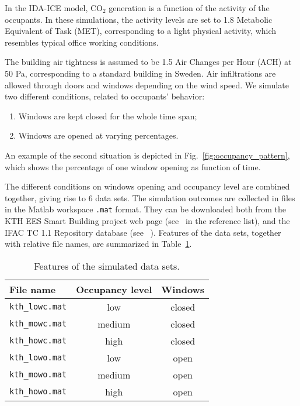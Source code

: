 \documentclass{article}
\begin{document}
In the IDA-ICE model, CO$_2$ generation is a function of the activity of the
occupants. In these simulations, the activity levels are set to 1.8 Metabolic
Equivalent of Task (MET), corresponding to a light physical activity, which
resembles typical office working conditions.

The building air tightness is assumed to be 1.5 Air Changes per Hour (ACH) at
50 Pa, corresponding to a standard building in Sweden. Air infiltrations
are allowed through doors and windows depending on the wind speed.
We simulate two different conditions, related to occupants' behavior:
\begin{enumerate}
\item Windows are kept closed for the whole time span;
\item Windows are opened at varying percentages.
\end{enumerate}
An example of the second situation is depicted in
Fig.~\ref{fig:occupancy_pattern}, which shows the percentage of one window
opening as function of time.

The different conditions on windows opening and occupancy level are combined
together, giving rise to 6 data sets. The simulation outcomes are collected in
files in the Matlab workspace \texttt{.mat} format. They can be downloaded both
from the KTH EES Smart Building project web page (see~\citeauthor{kth-ees2015ees}
in the reference list), and the IFAC TC 1.1 Repository database (see
~\citeauthor{ifac2015ifac}). Features of the data sets, together with
relative file names, are summarized in Table~\ref{tab:datasets}.

\begin{table}[h!]\label{tab:datasets}
\begin{center}
\begin{tabular}{lcc}
File name & Occupancy level & Windows \\
\toprule
\texttt{kth\_lowc.mat} & low	& closed \\
\texttt{kth\_mowc.mat} & medium	& closed \\
\texttt{kth\_howc.mat} & high	& closed \\
\texttt{kth\_lowo.mat} & low	& open \\
\texttt{kth\_mowo.mat} & medium	& open \\
\texttt{kth\_howo.mat} & high	& open \\
\bottomrule
\end{tabular}
\vspace{2mm}
\caption{Features of the simulated data sets.}
\end{center}
\end{table}
\end{document}
